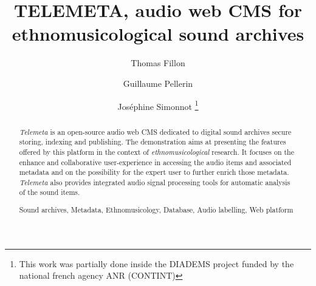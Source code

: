 \documentclass[runningheads,a4paper]{llncs}
\newcommand{\keywords}[1]{\par\addvspace\baselineskip
\noindent\keywordname\enspace\ignorespaces#1}
\begin{document}
\mainmatter  %

\title{TELEMETA, audio web CMS for ethnomusicological sound archives}


%
%
\author{Thomas Fillon \and Guillaume Pellerin
 \and Jos{\'e}phine Simonnot 
\thanks{This work was partially done inside the DIADEMS project funded by the national french agency ANR (CONTINT)}
}
%


\maketitle

\setcounter{footnote}{0}


\begin{abstract}
\emph{Telemeta} is an open-source audio web CMS dedicated to digital sound archives secure storing, indexing and publishing. The demonstration aims at presenting the features offered by this platform in the context of \emph{ethnomusicological} research. It focuses on the enhance and collaborative user-experience in accessing the audio items and associated metadata and on the possibility for the expert user to further enrich those metadata. \emph{Telemeta} also provides integrated audio signal processing tools for automatic analysis of the sound items.
\keywords{Sound archives, Metadata, Ethnomusicology, Database, Audio labelling, Web platform}
\end{abstract}
\end{document}
